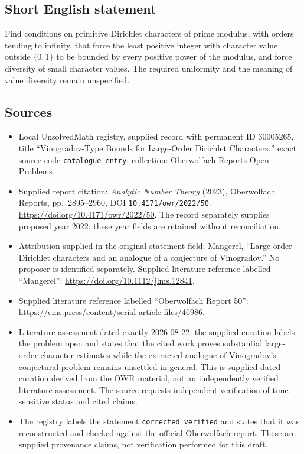 \documentclass[11pt]{article}
\begin{document}
\subsection{Short English statement}
Find conditions on primitive Dirichlet characters of prime modulus, with orders tending to infinity, that force the least positive integer with character value outside \(\{0,1\}\) to be bounded by every positive power of the modulus, and force diversity of small character values. The required uniformity and the meaning of value diversity remain unspecified.
\subsection{Sources}
\begin{itemize}
\item Local UnsolvedMath registry, supplied record with permanent ID \(30005265\), title ``Vinogradov-Type Bounds for Large-Order Dirichlet Characters,'' exact source code \texttt{catalogue entry}; collection: Oberwolfach Reports Open Problems.
\item Supplied report citation: \emph{Analytic Number Theory} (2023), Oberwolfach Reports, pp.\ 2895--2960, DOI \texttt{10.4171/owr/2022/50}. \url{https://doi.org/10.4171/owr/2022/50}. The record separately supplies proposed year 2022; these year fields are retained without reconciliation.
\item Attribution supplied in the original-statement field: Mangerel, ``Large order Dirichlet characters and an analogue of a conjecture of Vinogradov.'' No proposer is identified separately. Supplied literature reference labelled ``Mangerel'': \url{https://doi.org/10.1112/jlms.12841}.
\item Supplied literature reference labelled ``Oberwolfach Report 50'': \url{https://ems.press/content/serial-article-files/46986}.
\item Literature assessment dated exactly 2026-08-22: the supplied curation labels the problem open and states that the cited work proves substantial large-order character estimates while the extracted analogue of Vinogradov's conjectural problem remains unsettled in general. This is supplied dated curation derived from the OWR material, not an independently verified literature assessment. The source requests independent verification of time-sensitive status and cited claims.
\item The registry labels the statement \texttt{corrected\_verified} and states that it was reconstructed and checked against the official Oberwolfach report. These are supplied provenance claims, not verification performed for this draft.
\end{itemize}
\end{document}
